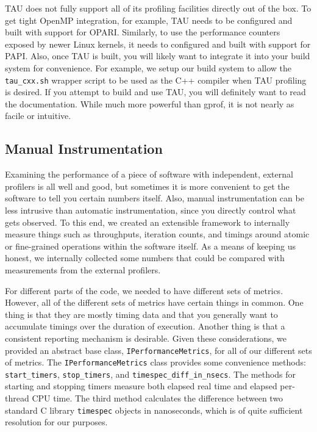 \documentclass{article}
\begin{document}
TAU does not fully support all of its profiling facilities directly out of the box. To get tight OpenMP integration, for example, TAU needs to be configured and built with support for OPARI. Similarly, to use the performance counters exposed by newer Linux kernels, it needs to configured and built with support for PAPI. Also, once TAU is built, you will likely want to integrate it into your build system for convenience. For example, we setup our build system to allow the \texttt{tau\_cxx.sh} wrapper script to be used as the C++ compiler when TAU profiling is desired. If you attempt to build and use TAU, you will definitely want to read the documentation. While much more powerful than gprof, it is not nearly as facile or intuitive.


\subsection{Manual Instrumentation}

Examining the performance of a piece of software with independent, external profilers is all well and good, but sometimes it is more convenient to get the software to tell you certain numbers itself. Also, manual instrumentation can be less intrusive than automatic instrumentation, since you directly control what gets observed. To this end, we created an extensible framework to internally measure things such as throughputs, iteration counts, and timings around atomic or fine-grained operations within the software itself. As a means of keeping us honest, we internally collected some numbers that could be compared with measurements from the external profilers.

For different parts of the code, we needed to have different sets of metrics. However, all of the different sets of metrics have certain things in common. One thing is that they are mostly timing data and that you generally want to accumulate timings over the duration of execution. Another thing is that a consistent reporting mechanism is desirable. Given these considerations, we provided an abstract base class, \texttt{IPerformanceMetrics}, for all of our different sets of metrics. The \texttt{IPerformanceMetrics} class provides some convenience methods: \texttt{start\_timers}, \texttt{stop\_timers}, and \texttt{timespec\_diff\_in\_nsecs}. The methods for starting and stopping timers measure both elapsed real time and elapsed per-thread CPU time. The third method calculates the difference between two standard C library \texttt{timespec} objects in nanoseconds, which is of quite sufficient resolution for our purposes.
\end{document}
